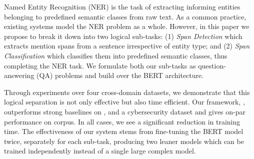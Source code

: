 Named Entity Recognition (NER) is the task of extracting informing entities belonging to predefined semantic classes from raw text. As a common practice, existing systems model the NER problem as a whole.
However, in this paper we propose to break it down into two logical sub-tasks: (1) \textit{Span Detection} which extracts mention spans from a sentence irrespective of entity type; and (2) \textit{Span Classification} which classifies them into predefined semantic classes, thus completing the NER task. We formulate both our sub-tasks as question-answering (QA) problems and build over the BERT architecture.

Through experiments over four cross-domain datasets, we demonstrate that this logical separation is not only effective but also time efficient. Our  framework, \modelname{}, outperforms strong baselines on ,  and a cybersecurity dataset and gives on-par performance on  corpus. In all cases, we see a significant reduction in training time.
The effectiveness of our system stems from fine-tuning the BERT model twice, separately for each sub-task, producing two leaner models which can be trained independently instead of a single large complex model.

